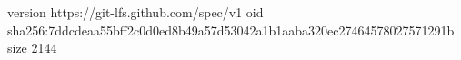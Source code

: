 version https://git-lfs.github.com/spec/v1
oid sha256:7ddcdeaa55bff2c0d0ed8b49a57d53042a1b1aaba320ec27464578027571291b
size 2144
